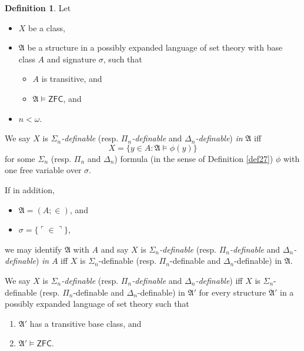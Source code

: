 \documentclass[12pt, twoside]{memoir}
\numberwithin{equation}{section}
\theoremstyle{definition}
\newtheorem{defi}[thm]{Definition}
\theoremstyle{remark}
\theoremstyle{definition}
\theoremstyle{definition}
\theoremstyle{definition}
\theoremstyle{remark}
\begin{document}
\begin{defi}
Let 
\begin{itemize}
    \item $X$ be a class, 
    \item $\mathfrak{A}$ be a structure in a possibly expanded language of set theory with base class $A$ and signature $\sigma$, such that 
    \begin{itemize}[label=$\circ$]
        \item $A$ is transitive, and
        \item $\mathfrak{A} \models \mathsf{ZFC}$, and
    \end{itemize}
    \item $n < \omega$.
\end{itemize}
We say $X$ is $\Sigma_n$\emph{-definable} (resp. $\Pi_n$\emph{-definable} and $\Delta_n$\emph{-definable}) \emph{in} $\mathfrak{A}$ iff $$X = \{y \in A : \mathfrak{A} \models \phi(y)\}$$ for some $\Sigma_n$ (resp. $\Pi_n$ and $\Delta_n$) formula (in the sense of Definition \ref{def27}) $\phi$ with one free variable over $\sigma$.

If in addition,
\begin{itemize}
    \item $\mathfrak{A} = (A; \in)$, and
    \item $\sigma = \{\ulcorner \in \urcorner\}$,
\end{itemize}
we may identify $\mathfrak{A}$ with $A$ and say $X$ is $\Sigma_n$\emph{-definable} (resp. $\Pi_n$\emph{-definable} and $\Delta_n$\emph{-definable}) \emph{in} $A$ iff $X$ is $\Sigma_n$-definable (resp. $\Pi_n$-definable and $\Delta_n$-definable) in $\mathfrak{A}$. 

We say $X$ is $\Sigma_n$\emph{-definable} (resp. $\Pi_n$\emph{-definable} and $\Delta_n$\emph{-definable}) iff $X$ is $\Sigma_n$-definable (resp. $\Pi_n$-definable and $\Delta_n$-definable) in $\mathfrak{A}'$ for every structure $\mathfrak{A}'$ in a possibly expanded language of set theory such that
\begin{enumerate}[label=(\alph*)]
    \item $\mathfrak{A}'$ has a transitive base class, and
    \item $\mathfrak{A}' \models \mathsf{ZFC}$.
\end{enumerate}
\end{defi}
\end{document}
